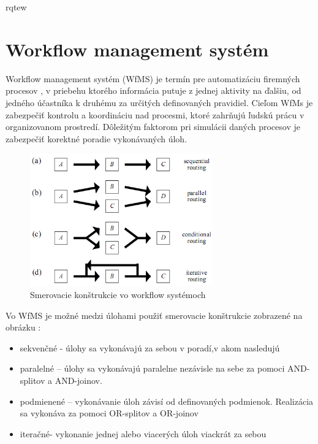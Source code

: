 
rqtew
\section{Workflow management systém}

Workflow management systém (WfMS) je termín pre automatizáciu firemných procesov , v priebehu ktorého informácia putuje z jednej aktivity na ďalšiu, od jedného účastníka k druhému za určitých definovaných pravidiel. Cieľom WfMs je zabezpečiť kontrolu a koordináciu nad procesmi, ktoré zahrňujú ľudskú prácu v organizovanom prostredí.
Dôležitým faktorom pri simulácii daných procesov je zabezpečiť korektné poradie vykonávaných úloh.


\begin{figure}[h]
	\centerline{\includegraphics[width=0.7\textwidth]{images/smerovacie_konstrukcie}}
	\caption[smerovacie konštrukcie]{Smerovacie konštrukcie vo workflow systémoch}
	\label{obr:cursus}
\end{figure}


Vo WfMS je možné medzi úlohami použiť smerovacie konštrukcie zobrazené na obrázku :
\begin{itemize}
	\item sekvenčné - úlohy sa vykonávajú za sebou v poradí,v akom nasledujú
	\item paralelné – úlohy sa vykonávajú paralelne nezávisle na sebe za pomoci AND-splitov a AND-joinov.
	\item podmienené – vykonávanie úloh závisí od definovaných podmienok. Realizácia sa vykonáva za pomoci OR-splitov a OR-joinov
	\item iteračné- vykonanie jednej alebo viacerých úloh viackrát za sebou
\end{itemize}

